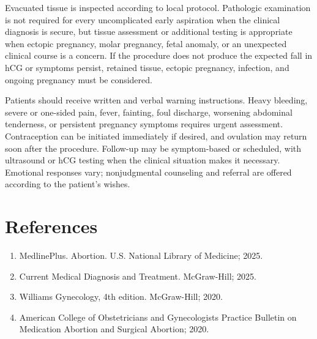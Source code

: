 Evacuated tissue is inspected according to local protocol. Pathologic examination is not required for every uncomplicated early aspiration when the clinical diagnosis is secure, but tissue assessment or additional testing is appropriate when ectopic pregnancy, molar pregnancy, fetal anomaly, or an unexpected clinical course is a concern. If the procedure does not produce the expected fall in hCG or symptoms persist, retained tissue, ectopic pregnancy, infection, and ongoing pregnancy must be considered.

Patients should receive written and verbal warning instructions. Heavy bleeding, severe or one-sided pain, fever, fainting, foul discharge, worsening abdominal tenderness, or persistent pregnancy symptoms requires urgent assessment. Contraception can be initiated immediately if desired, and ovulation may return soon after the procedure. Follow-up may be symptom-based or scheduled, with ultrasound or hCG testing when the clinical situation makes it necessary. Emotional responses vary; nonjudgmental counseling and referral are offered according to the patient's wishes.

\section*{References}
\begin{enumerate}
  \item MedlinePlus. Abortion. U.S. National Library of Medicine; 2025.
  \item Current Medical Diagnosis and Treatment. McGraw-Hill; 2025.
  \item Williams Gynecology, 4th edition. McGraw-Hill; 2020.
  \item American College of Obstetricians and Gynecologists Practice Bulletin on Medication Abortion and Surgical Abortion; 2020.
\end{enumerate}

\clearpage
